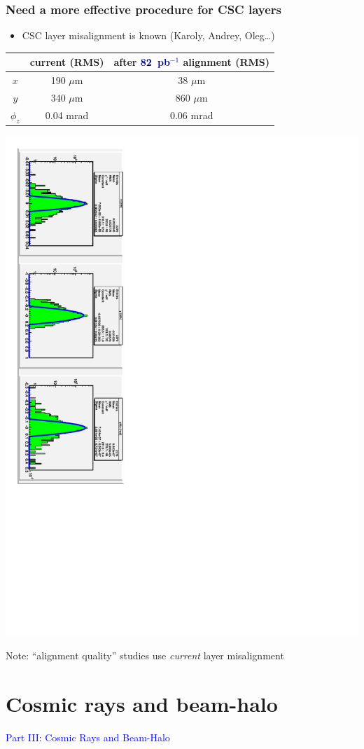 \documentclass[compress]{beamer}
\begin{document}
\begin{frame}
\frametitle{Need a more effective procedure for CSC layers}
\begin{itemize}
\item CSC layer misalignment is known (Karoly, Andrey, Oleg\ldots)
\end{itemize}
\begin{center}
\begin{tabular}{c c c}
& current (RMS) & after \textcolor{darkblue}{82~pb$^{-1}$} alignment (RMS) \\\hline
$x$ & 190 $\mu$m & 38 $\mu$m \\
$y$ & 340 $\mu$m & 860 $\mu$m \\
$\phi_z$ & 0.04 mrad & 0.06 mrad \\
\end{tabular}

\includegraphics[height=0.9\linewidth, angle=90]{layer_alignment.pdf}
\end{center}

Note: ``alignment quality'' studies use {\it current} layer misalignment
\end{frame}

\section*{Cosmic rays and beam-halo}

\begin{frame}
\begin{center}
\Huge \textcolor{blue}{\sc Part III: Cosmic Rays and Beam-Halo}
\end{center}
\end{frame}
\end{document}
